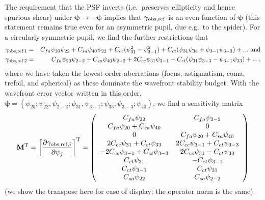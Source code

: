 \documentclass[aps,prd, amsmath,amssymb,superscriptaddress,showkeys,nofootinbib,reprint,preprintnumbers]{revtex4-1}
\begin{document}
\begin{widetext}
The requirement that the PSF inverts (i.e.\ preserves ellipticity and
hence spurious shear) under
${\boldsymbol\psi}\rightarrow-{\boldsymbol\psi}$ implies that
${\boldsymbol\gamma}_{\rm obs,ref}$ is an even function of
${\boldsymbol\psi}$ (this statement remains true even for an
asymmetric pupil, due e.g.\ to the spider). For a circularly symmetric
pupil, we find the further restrictions that
\begin{eqnarray}
\gamma_{\rm obs,ref\,1} &=& C_{fa} \psi_{20} \psi_{22} + C_{sa} \psi_{40} \psi_{22}
+ C_{cc} (\psi_{31}^2-\psi_{3-1}^2) + C_{ct} (\psi_{31}\psi_{33} + \psi_{3-1}\psi_{3-3})
+ ...~{\rm and}
\nonumber \\
\gamma_{\rm obs,ref\,2} &=& C_{fa} \psi_{20} \psi_{2-2} + C_{sa} \psi_{40} \psi_{2-2}
+ 2C_{cc} \psi_{31} \psi_{3-1} + C_{ct} (\psi_{31}\psi_{3-3} - \psi_{3-1}\psi_{33})
+ ...\,,
\end{eqnarray}
where we have taken the lowest-order aberrations (focus, astigmatism,
coma, trefoil, and spherical) as these dominate the wavefront
stability budget. With the wavefront error vector written in this
order, ${\boldsymbol\psi} = (\psi_{20}; \psi_{22},\psi_{2-2};
\psi_{31},\psi_{3-1}; \psi_{33},\psi_{3-3}; \psi_{40})$, we find a
sensitivity matrix
\begin{equation}
{\bf M}^{\rm T} = \left[ \frac{\partial \gamma_{{\rm obs,ref},i}}{\partial\psi_j} \right]^{\rm T}
= \left( \begin{array}{cc}
C_{fa}\psi_{22}  & C_{fa}\psi_{2-2} \\
C_{fa}\psi_{20}+C_{sa}\psi_{40} & 0 \\
0 & C_{fa}\psi_{20}+C_{sa}\psi_{40} \\
2C_{cc}\psi_{31}+C_{ct}\psi_{33} & 2C_{cc}\psi_{3-1}+C_{ct}\psi_{3-3} \\
-2C_{cc}\psi_{3-1}+C_{ct}\psi_{3-3} & 2C_{cc}\psi_{31}-C_{ct}\psi_{33} \\
C_{ct}\psi_{31} & -C_{ct}\psi_{3-1} \\
C_{ct}\psi_{3-1} & C_{ct}\psi_{31} \\
C_{sa}\psi_{22} & C_{sa}\psi_{2-2}
\end{array} \right)
\label{eq:TheMatrix}
\end{equation}
(we show the transpose here for ease of display; the operator norm is the same).


\end{widetext}
\end{document}

